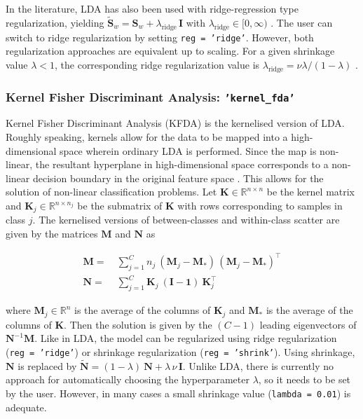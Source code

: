 \documentclass[utf8]{frontiersSCNS} %
\newcommand{\I}{\mathbf{I}}
\newcommand{\K}{\mathbf{K}}
\newcommand{\M}{\mathbf{M}}
\newcommand{\R}{\mathbb{R}}
\renewcommand{\S}{\mathbf{S}}
\newcommand{\ttt}[1]{\texttt{#1}}
\begin{document}
In the literature, LDA has also been used with ridge-regression type regularization, yielding $\widetilde{\S}_w = \S_w + \lambda_\text{ridge}\,\I$ with $\lambda_\text{ridge}\in [0,\infty)$ \citep{Friedman1989RegularizedAnalysis}. The user can switch to ridge regularization by setting \ttt{reg = 'ridge'}. However, both regularization approaches are equivalent up to scaling. For a given shrinkage value $\lambda<1$, the corresponding ridge regularization value is $\lambda_\text{ridge} = \nu\lambda / (1-\lambda)$
\citep{Treder2018Cross-validationLDA}.


\subsubsection{Kernel Fisher Discriminant Analysis: \ttt{'kernel\_fda'}}

Kernel Fisher Discriminant Analysis (KFDA) is the kernelised version of LDA. Roughly speaking, kernels allow for the data to be mapped into a high-dimensional space wherein ordinary LDA is performed. Since the map is non-linear, the resultant hyperplane in high-dimensional space corresponds to a non-linear decision boundary in the original feature space \citep{Mika1999FisherKernels}. This allows for the solution of non-linear classification problems. Let $\K\in\R^{n\times n}$ be the kernel matrix and $\K_j\in\R^{n \times n_j}$ be the submatrix of $\K$ with rows corresponding to samples in class $j$. The kernelised versions of between-classes and within-class scatter are given by the matrices $\M$ and $\mathbf{N}$ as


\begin{equation*}
\begin{alignedat}{2}
\M =\ &  \sum_{j=1}^C n_j\ (\M_j - \M_*)\,(\M_j-\M_*)^\top\\
\mathbf{N} =\ & \sum_{j=1}^C \K_j\ (\mathbf{I} - \mathbf{1})\  \K_j^\top
\end{alignedat}
\end{equation*}

where $\M_j\in\R^n$ is the average of the columns of $\K_j$ and $\M_*$ is the average of the columns of $\K$. Then the solution is given by the $(C-1)$ leading eigenvectors of $\mathbf{N}^{-1} \mathbf{M}$. 
Like in LDA, the model can be regularized using ridge regularization (\ttt{reg = 'ridge'}) or shrinkage regularization (\ttt{reg = 'shrink'}). Using shrinkage, $\mathbf{N}$ is replaced by $\widetilde{\mathbf{N}} = (1-\lambda)\ \mathbf{N} + \lambda\,\nu\,\I$. Unlike LDA, there is currently no approach for automatically choosing the hyperparameter $\lambda$, so it needs to be set by the user. However, in many cases a small shrinkage value (\ttt{lambda = 0.01}) is adequate.
\end{document}
